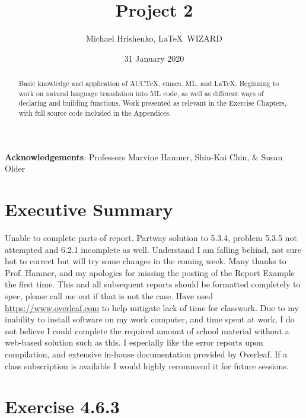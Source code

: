 \documentclass[twoside]{report}
\title{Project 2}
\date{31 January 2020}
\author{Michael Hrishenko, \LaTeX\ WIZARD}
\begin{document}
\lstset{language=ML}
\maketitle
\begin{abstract}
    Basic knowledge and application of AUCTeX, emacs, ML, and \LaTeX{}. Beginning to work on natural language translation into ML code, as well as different ways of declaring and building functions. Work presented as relevant in the Exercise Chapters, with full source code included in the Appendices.
\end{abstract}

\textbf{Acknowledgements}: Professors Marvine Hamner, Shiu-Kai Chin, \& Susan Older

\tableofcontents

\chapter{Executive Summary}
\label{cha:executive-summary}
Unable to complete parts of report. Partway solution to 5.3.4, problem 5.3.5 not attempted and 6.2.1 incomplete as well. Understand I am falling behind, not sure hot to correct but will try some changes in the coming week. Many thanks to Prof. Hamner, and my apologies for missing the posting of the Report Example the first time. This and all subsequent reports should be formatted completely to spec, please call me out if that is not the case. Have used \url{https://www.overleaf.com} to help mitigate lack of time for classwork. Due to my inability to install software on my work computer, and time spent at work, I do not believe I could complete the required amount of school material without a web-based solution such as this. I especially like the error reports upon compilation, and extensive in-house documentation provided by Overleaf. If a class subscription is available I would highly recommend it for future sessions.

\chapter{Exercise 4.6.3}
\label{cha:4-6-3}
\end{document}
